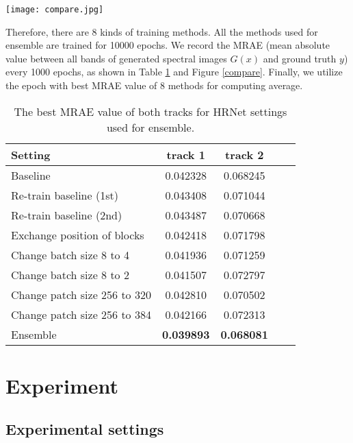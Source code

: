 \documentclass[10pt,twocolumn,letterpaper]{article}
\begin{document}
\begin{figure*}[htbp]
\centering
\texttt{[image: compare.jpg]}
\caption{The MRAE between ground truth spectral images and the generated images of different hyper-parameter settings for ensemble.}
\label{compare}
\end{figure*}

Therefore, there are 8 kinds of training methods. All the methods used for ensemble are trained for 10000 epochs. We record the MRAE (mean absolute value between all bands of generated spectral images $G(x)$ and ground truth $y$) every 1000 epochs, as shown in Table \ref{compare_table} and Figure \ref{compare}. Finally, we utilize the epoch with best MRAE value of 8 methods for computing average.

\begin{table}[t]
\begin{center}
\begin{tabular}{lcccc}
\hline
Setting & track 1 & track 2 \\
\hline
\hline
Baseline & 0.042328 & 0.068245 \\
Re-train baseline (1st) & 0.043408 & 0.071044 \\
Re-train baseline (2nd) & 0.043487 & 0.070668 \\
Exchange position of blocks & 0.042418 & 0.071798 \\
Change batch size 8 to 4 & 0.041936 & 0.071259 \\
Change batch size 8 to 2 & 0.041507 & 0.072797 \\
Change patch size 256 to 320 & 0.042810 & 0.070502 \\
Change patch size 256 to 384 & 0.042166 & 0.072313 \\
\hline
\hline
Ensemble & \textbf{0.039893} & \textbf{0.068081} \\
\hline
\end{tabular}
\end{center}
\caption{The best MRAE value of both tracks for HRNet settings used for ensemble.}
\label{compare_table}
\end{table}

\section{Experiment}

\subsection{Experimental settings}
\end{document}
